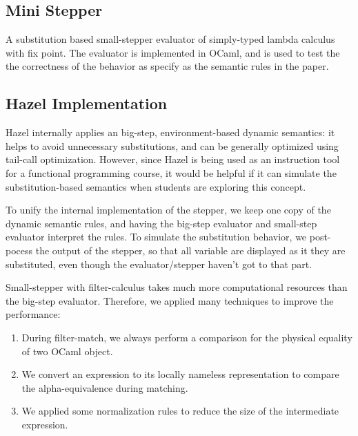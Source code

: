 \subsection{Mini Stepper}

A substitution based small-stepper evaluator of simply-typed lambda
calculus with fix point. The evaluator is implemented in OCaml, and is
used to test the the correctness of the behavior as specify as the
semantic rules in the paper.

\subsection{Hazel Implementation}

Hazel internally applies an big-step, environment-based dynamic
semantics: it helps to avoid unnecessary substitutions, and can be
generally optimized using tail-call optimization. However, since Hazel
is being used as an instruction tool for a functional programming
course, it would be helpful if it can simulate the substitution-based
semantics when students are exploring this concept.

To unify the internal implementation of the stepper, we keep one copy
of the dynamic semantic rules, and having the big-step evaluator and
small-step evaluator interpret the rules. To simulate the substitution
behavior, we post-pocess the output of the stepper, so that all
variable are displayed as it they are substituted, even though the
evaluator/stepper haven't got to that part.

Small-stepper with filter-calculus takes much more computational
resources than the big-step evaluator. Therefore, we applied many
techniques to improve the performance:

\begin{enumerate}
\item During filter-match, we always perform a comparison for the
  physical equality of two OCaml object.
\item We convert an expression to its locally nameless representation
  to compare the alpha-equivalence during matching.
\item We applied some normalization rules to reduce the size of the
  intermediate expression.
\end{enumerate}




